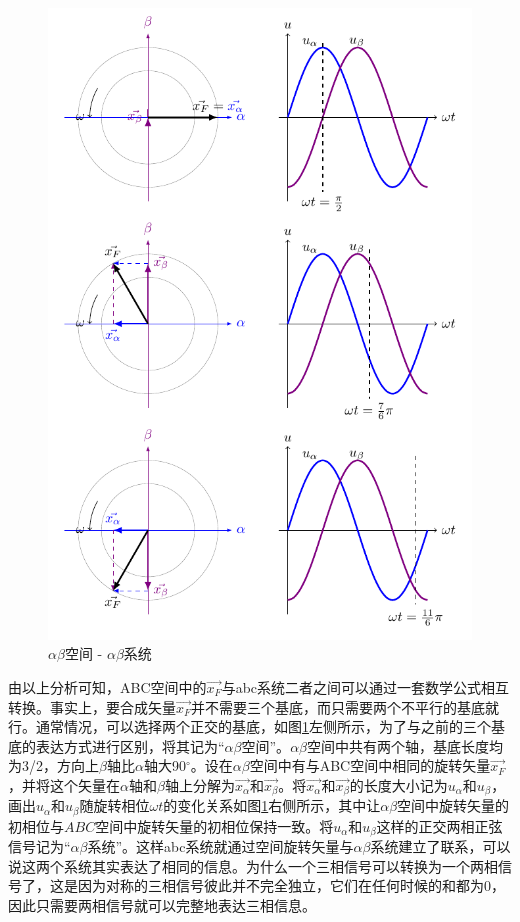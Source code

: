 \documentclass{ctexart}
\numberwithin{equation}{section}
\begin{document}
\begin{figure}[hbtp]
\begin{minipage}[b]{0.48\linewidth}
\includegraphics[width = \linewidth]{alpha-beta-space.pdf}
\caption{$\alpha \beta $空间 - $\alpha \beta $系统}
\label{alpha-beta-space}
\end{minipage}
\end{figure}

由以上分析可知，ABC空间中的$ \vec{x_F} $与abc系统二者之间可以通过一套数学公式相互转换。事实上，要合成矢量$ \vec{x_F} $并不需要三个基底，而只需要两个不平行的基底就行。通常情况，可以选择两个正交的基底，如图\ref{alpha-beta-space}左侧所示，为了与之前的三个基底的表达方式进行区别，将其记为“$\alpha \beta$空间”。$\alpha \beta$空间中共有两个轴，基底长度均为3/2，方向上$ \beta $轴比$ \alpha $轴大90$ ^\circ $。设在$\alpha \beta$空间中有与ABC空间中相同的旋转矢量$ \vec{x_F} $，并将这个矢量在$ \alpha $轴和$ \beta $轴上分解为$\vec{x_{\alpha}}$和$\vec{x_{\beta}}$。将$\vec{x_{\alpha}}$和$\vec{x_{\beta}}$的长度大小记为${u_{\alpha}}$和${u_{\beta}}$，画出${u_{\alpha}}$和${u_{\beta}}$随旋转相位$\omega t$的变化关系如图\ref{alpha-beta-space}右侧所示，其中让$\alpha \beta$空间中旋转矢量的初相位与$ABC$空间中旋转矢量的初相位保持一致。将${u_{\alpha}}$和${u_{\beta}}$这样的正交两相正弦信号记为“$\alpha \beta$系统”。这样abc系统就通过空间旋转矢量与$\alpha \beta$系统建立了联系，可以说这两个系统其实表达了相同的信息。为什么一个三相信号可以转换为一个两相信号了，这是因为对称的三相信号彼此并不完全独立，它们在任何时候的和都为0，因此只需要两相信号就可以完整地表达三相信息。
\end{document}
